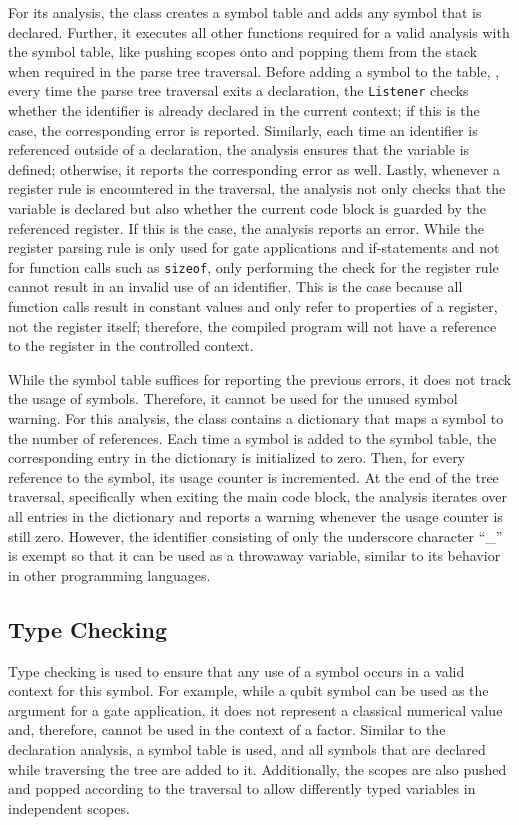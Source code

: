 For its analysis, the class creates a symbol table and adds any symbol that is declared. Further, it executes all other functions required for a valid analysis with the symbol table, like pushing scopes onto and popping them from the stack when required in the parse tree traversal. Before adding a symbol to the table, \ie, every time the parse tree traversal exits a declaration, the \texttt{Listener} checks whether the identifier is already declared in the current context; if this is the case, the corresponding error is reported. Similarly, each time an identifier is referenced outside of a declaration, the analysis ensures that the variable is defined; otherwise, it reports the corresponding error as well. Lastly, whenever a register rule is encountered in the traversal, the analysis not only checks that the variable is declared but also whether the current code block is guarded by the referenced register. If this is the case, the analysis reports an error. While the register parsing rule is only used for gate applications and if-statements and not for function calls such as \texttt{sizeof}, only performing the check for the register rule cannot result in an invalid use of an identifier. This is the case because all function calls result in constant values and only refer to properties of a register, not the register itself; therefore, the compiled program will not have a reference to the register in the controlled context.

While the symbol table suffices for reporting the previous errors, it does not track the usage of symbols. Therefore, it cannot be used for the unused symbol warning. For this analysis, the class contains a dictionary that maps a symbol to the number of references. Each time a symbol is added to the symbol table, the corresponding entry in the dictionary is initialized to zero. Then, for every reference to the symbol, its usage counter is incremented. At the end of the tree traversal, specifically when exiting the main code block, the analysis iterates over all entries in the dictionary and reports a warning whenever the usage counter is still zero. However, the identifier consisting of only the underscore character ``\_'' is exempt so that it can be used as a throwaway variable, similar to its behavior in other programming languages.

\subsection{Type Checking}
\label{sec:implementation_typeCheckingAnalayis}
Type checking is used to ensure that any use of a symbol occurs in a valid context for this symbol. For example, while a qubit symbol can be used as the argument for a gate application, it does not represent a classical numerical value and, therefore, cannot be used in the context of a factor. Similar to the declaration analysis, a symbol table is used, and all symbols that are declared while traversing the tree are added to it. Additionally, the scopes are also pushed and popped according to the traversal to allow differently typed variables in independent scopes.

